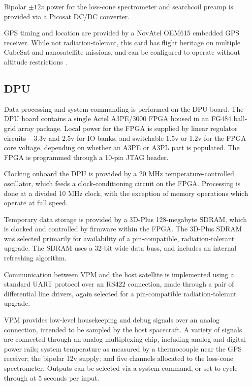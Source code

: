 Bipolar $\pm 12v$ power for the loss-cone spectrometer and searchcoil preamp is provided via a Picosat DC/DC converter. %

GPS timing and location are provided by a NovAtel OEM615 embedded GPS receiver. While not radiation-tolerant, this card has flight heritage on multiple CubeSat and nanosatellite missions, and can be configured to operate without altitude restrictions \citep{Spangelo2013}.

\subsection{DPU}
Data processing and system commanding is performed on the DPU board. The DPU board contains a single Actel A3PE/3000 FPGA housed in an FG484 ball-grid array package. Local power for the FPGA is supplied by linear regulator circuits -- 3.3v and 2.5v for IO banks, and switchable 1.5v or 1.2v for the FPGA core voltage, depending on whether an A3PE or A3PL part is populated. The FPGA is programmed through a 10-pin JTAG header.

Clocking onboard the DPU is provided by a 20 MHz temperature-controlled oscillator, which feeds a clock-conditioning circuit on the FPGA. Processing is done at a divided 10 MHz clock, with the exception of memory operations which operate at full speed.

Temporary data storage is provided by a 3D-Plus 128-megabyte SDRAM, which is clocked and controlled by firmware within the FPGA. The 3D-Plus SDRAM was selected primarily for availability of a pin-compatible, radiation-tolerant upgrade. The SDRAM uses a 32-bit wide data buss, and includes an internal refreshing algorithm.

Communication between VPM and the host satellite is implemented using a standard UART protocol over an RS422 connection, made through a pair of differential line drivers, again selected for a pin-compatible radiation-tolerant upgrade. %

VPM provides low-level housekeeping and debug signals over an analog connection, intended to be sampled by the host spacecraft. A variety of signals are connected through an analog multiplexing chip, including analog and digital power rails; system temperature as measured by a thermocouple near the GPS receiver; the bipolar 12v supply; and five channels allocated to the loss-cone spectrometer. Outputs can be selected via a system command, or set to cycle through at 5 seconds per input.

